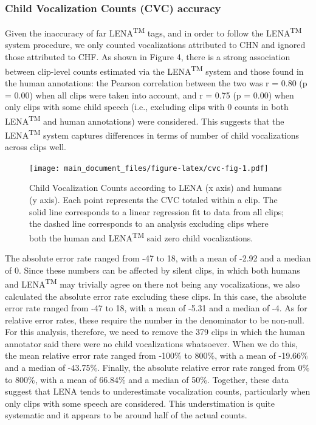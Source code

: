 \documentclass[english,table,man,floatsintext]{apa6}
\begin{document}
\hypertarget{child-vocalization-counts-cvc-accuracy}{%
\subsubsection{Child Vocalization Counts (CVC) accuracy}\label{child-vocalization-counts-cvc-accuracy}}

Given the inaccuracy of far LENA\textsuperscript{TM} tags, and in order to follow the LENA\textsuperscript{TM} system procedure, we only counted vocalizations attributed to CHN and ignored those attributed to CHF. As shown in Figure 4, there is a strong association between clip-level counts estimated via the LENA\textsuperscript{TM} system and those found in the human annotations: the Pearson correlation between the two was r = 0.80 (p = 0.00) when all clips were taken into account, and r = 0.75 (p = 0.00) when only clips with some child speech (i.e., excluding clips with 0 counts in both LENA\textsuperscript{TM} and human annotations) were considered. This suggests that the LENA\textsuperscript{TM} system captures differences in terms of number of child vocalizations across clips well.

\begin{figure}
\centering
\texttt{[image: main\_document\_files/figure-latex/cvc-fig-1.pdf]}
\caption{\label{fig:cvc-fig}Child Vocalization Counts according to LENA (x axis) and humans (y axis). Each point represents the CVC totaled within a clip. The solid line corresponds to a linear regression fit to data from all clips; the dashed line corresponds to an analysis excluding clips where both the human and LENA\textsuperscript{TM} said zero child vocalizations.}
\end{figure}

The absolute error rate ranged from -47 to 18, with a mean of -2.92 and a median of 0. Since these numbers can be affected by silent clips, in which both humans and LENA\textsuperscript{TM} may trivially agree on there not being any vocalizations, we also calculated the absolute error rate excluding these clips. In this case, the absolute error rate ranged from -47 to 18, with a mean of -5.31 and a median of -4. As for relative error rates, these require the number in the denominator to be non-null. For this analysis, therefore, we need to remove the 379 clips in which the human annotator said there were no child vocalizations whatsoever. When we do this, the mean relative error rate ranged from -100\% to 800\%, with a mean of -19.66\% and a median of -43.75\%. Finally, the absolute relative error rate ranged from 0\% to 800\%, with a mean of 66.84\% and a median of 50\%. Together, these data suggest that LENA tends to underestimate vocalization counts, particularly when only clips with some speech are considered. This understimation is quite systematic and it appears to be around half of the actual counts.
\end{document}
